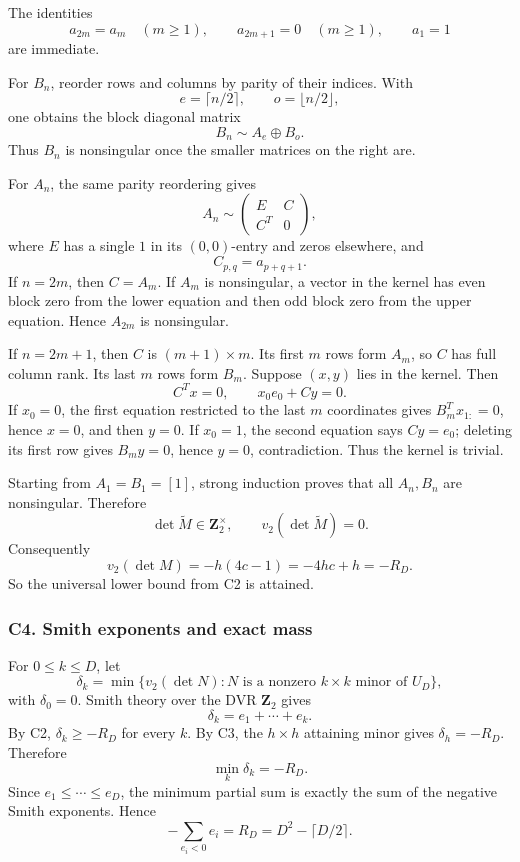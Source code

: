 \documentclass[
  10pt,
  letterpaper,
]{article}
\theoremstyle{definition}
\theoremstyle{remark}
\begin{document}
The identities \[
a_{2m}=a_m\quad(m\ge1),
\qquad
a_{2m+1}=0\quad(m\ge1),
\qquad a_1=1
\] are immediate.

For \(B_n\), reorder rows and columns by parity of their indices. With
\[
e=\lceil n/2\rceil,
\qquad o=\lfloor n/2\rfloor,
\] one obtains the block diagonal matrix \[
B_n\sim A_e\oplus B_o.
\] Thus \(B_n\) is nonsingular once the smaller matrices on the right
are.

For \(A_n\), the same parity reordering gives \[
A_n\sim
\begin{pmatrix}
E&C\\
C^T&0
\end{pmatrix},
\] where \(E\) has a single \(1\) in its \((0,0)\)-entry and zeros
elsewhere, and \[
C_{p,q}=a_{p+q+1}.
\] If \(n=2m\), then \(C=A_m\). If \(A_m\) is nonsingular, a vector in
the kernel has even block zero from the lower equation and then odd
block zero from the upper equation. Hence \(A_{2m}\) is nonsingular.

If \(n=2m+1\), then \(C\) is \((m+1)\times m\). Its first \(m\) rows
form \(A_m\), so \(C\) has full column rank. Its last \(m\) rows form
\(B_m\). Suppose \((x,y)\) lies in the kernel. Then \[
C^T x=0,
\qquad
x_0e_0+Cy=0.
\] If \(x_0=0\), the first equation restricted to the last \(m\)
coordinates gives \(B_m^Tx_{1:}=0\), hence \(x=0\), and then \(y=0\). If
\(x_0=1\), the second equation says \(Cy=e_0\); deleting its first row
gives \(B_my=0\), hence \(y=0\), contradiction. Thus the kernel is
trivial.

Starting from \(A_1=B_1=[1]\), strong induction proves that all
\(A_n,B_n\) are nonsingular. Therefore \[
\det\widetilde M\in\mathbf Z_2^\times,
\qquad
v_2(\det\widetilde M)=0.
\] Consequently \[
v_2(\det M)
=-h(4c-1)
=-4hc+h
=-R_D.
\] So the universal lower bound from C2 is attained.

\subsubsection{C4. Smith exponents and exact
mass}\label{c4.-smith-exponents-and-exact-mass}

For \(0\le k\le D\), let \[
\delta_k
=
\min\{v_2(\det N):N\text{ is a nonzero }k\times k\text{ minor of }U_D\},
\] with \(\delta_0=0\). Smith theory over the DVR \(\mathbf Z_2\) gives
\[
\delta_k=e_1+\cdots+e_k.
\] By C2, \(\delta_k\ge -R_D\) for every \(k\). By C3, the \(h\times h\)
attaining minor gives \(\delta_h=-R_D\). Therefore \[
\min_k\delta_k=-R_D.
\] Since \(e_1\le\cdots\le e_D\), the minimum partial sum is exactly the
sum of the negative Smith exponents. Hence \[
\boxed{
-\sum_{e_i<0}e_i=R_D=D^2-\lceil D/2\rceil.
}
\]
\end{document}

